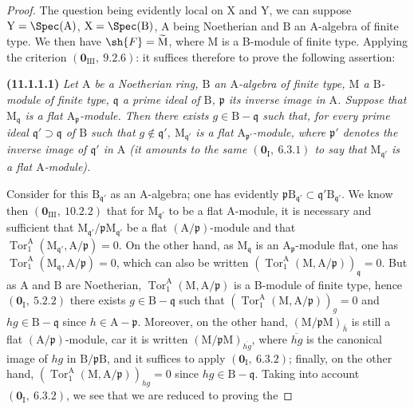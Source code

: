 \begin{proof}
The question being evidently local on $\mathrm{X}$ and $\mathrm{Y}$, we can suppose $\mathrm{Y}=\Spec(\mathrm{A})$, $\mathrm{X}=\Spec(\mathrm{B})$, $\mathrm{A}$ being Noetherian and $\mathrm{B}$ an A-algebra of finite type. We then have $\sh{F}=\widetilde{\mathrm{M}}$, where $\mathrm{M}$ is a B-module of finite type. Applying the criterion $(\mathbf{0}_{\mathrm{III}},~9.2.6)$: it suffices therefore to prove the following assertion:

\medskip
\noindent\textbf{(11.1.1.1)}
\emph{Let $\mathrm{A}$ be a Noetherian ring, $\mathrm{B}$ an $\mathrm{A}$-algebra of finite type, $\mathrm{M}$ a $\mathrm{B}$-module of finite type, $\mathfrak{q}$ a prime ideal of $\mathrm{B}$, $\mathfrak{p}$ its inverse image in $\mathrm{A}$. Suppose that $\mathrm{M}_\mathfrak{q}$ is a flat $\mathrm{A}_\mathfrak{p}$-module. Then there exists $g\in\mathrm{B}-\mathfrak{q}$ such that, for every prime ideal $\mathfrak{q}'\supset\mathfrak{q}$ of $\mathrm{B}$ such that $g\notin\mathfrak{q}'$, $\mathrm{M}_{\mathfrak{q}'}$ is a flat $\mathrm{A}_{\mathfrak{p}'}$-module, where $\mathfrak{p}'$ denotes the inverse image of $\mathfrak{q}'$ in $\mathrm{A}$ (it amounts to the same $(\mathbf{0}_\mathrm{I},~6.3.1)$ to say that $\mathrm{M}_{\mathfrak{q}'}$ is a flat $\mathrm{A}$-module).}
\medskip

Consider for this $\mathrm{B}_{\mathfrak{q}'}$ as an A-algebra; one has evidently $\mathfrak{p}\mathrm{B}_{\mathfrak{q}'}\subset\mathfrak{q}'\mathrm{B}_{\mathfrak{q}'}$.
We know then $(\mathbf{0}_{\mathrm{III}},~10.2.2)$ that for $\mathrm{M}_{\mathfrak{q}'}$ to be a flat A-module, it is necessary and sufficient that $\mathrm{M}_{\mathfrak{q}'}/\mathfrak{p}\mathrm{M}_{\mathfrak{q}'}$ be a flat $(\mathrm{A}/\mathfrak{p})$-module and that $\operatorname{Tor}_1^\mathrm{A}(\mathrm{M}_{\mathfrak{q}'},\mathrm{A}/\mathfrak{p})=0$.
On the other hand, as $\mathrm{M}_\mathfrak{q}$ is an $\mathrm{A}_\mathfrak{p}$-module flat, one has $\operatorname{Tor}_1^\mathrm{A}(\mathrm{M}_\mathfrak{q},\mathrm{A}/\mathfrak{p})=0$, which can also be written $(\operatorname{Tor}_1^\mathrm{A}(\mathrm{M},\mathrm{A}/\mathfrak{p}))_\mathfrak{q}=0$.
But as $\mathrm{A}$ and $\mathrm{B}$ are Noetherian, $\operatorname{Tor}_1^\mathrm{A}(\mathrm{M},\mathrm{A}/\mathfrak{p})$ is a B-module of finite type, hence $(\mathbf{0}_\mathrm{I},~5.2.2)$ there exists $g\in\mathrm{B}-\mathfrak{q}$ such that $(\operatorname{Tor}_1^\mathrm{A}(\mathrm{M},\mathrm{A}/\mathfrak{p}))_g=0$ and $hg\in\mathrm{B}-\mathfrak{q}$ since $h\in\mathrm{A}-\mathfrak{p}$.
Moreover, on the other hand, $(\mathrm{M}/\mathfrak{p}\mathrm{M})_{\bar{h}}$ is still a flat $(\mathrm{A}/\mathfrak{p})$-module, car it is written $(\mathrm{M}/\mathfrak{p}\mathrm{M})_{\overline{hg}}$, where $\overline{hg}$ is the canonical image of $hg$ in $\mathrm{B}/\mathfrak{p}\mathrm{B}$, and it suffices to apply $(\mathbf{0}_\mathrm{I},~6.3.2)$; finally, on the other hand, $(\operatorname{Tor}_1^\mathrm{A}(\mathrm{M},\mathrm{A}/\mathfrak{p}))_{hg}=0$ since $hg\in\mathrm{B}-\mathfrak{q}$.
Taking into account $(\mathbf{0}_\mathrm{I},~6.3.2)$, we see that we are reduced to proving the


\end{proof}
